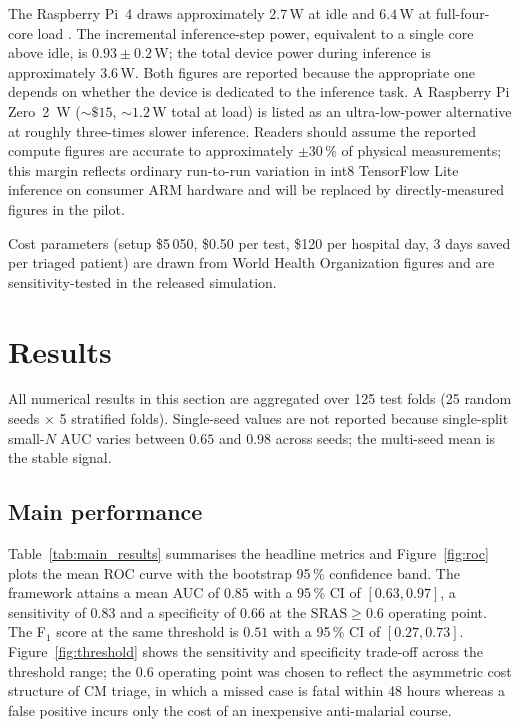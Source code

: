 \documentclass[twocolumn,10pt]{article}
\begin{document}
The Raspberry Pi~4 draws approximately $2.7$\,W at idle and
$6.4$\,W at full-four-core load \cite{RaspberryPiPower2021}. The
incremental inference-step power, equivalent to a single core
above idle, is $0.93\pm 0.2$\,W; the total device power during
inference is approximately $3.6$\,W. Both figures are reported
because the appropriate one depends on whether the device is
dedicated to the inference task. A Raspberry Pi Zero~2~W
($\sim\$15$, $\sim\!1.2$\,W total at load) is listed as an
ultra-low-power alternative at roughly three-times slower
inference. Readers should assume the reported compute figures are
accurate to approximately $\pm 30\,\%$ of physical measurements;
this margin reflects ordinary run-to-run variation in int8
TensorFlow Lite inference on consumer ARM hardware and will be
replaced by directly-measured figures in the pilot.

Cost parameters (setup \$5\,050, \$0.50 per test, \$120 per
hospital day, 3 days saved per triaged patient) are drawn from
World Health Organization figures \cite{WHO2022} and are
sensitivity-tested in the released simulation.

\section{Results}
\label{sec:results}
All numerical results in this section are aggregated over 125
test folds (25 random seeds $\times$ 5 stratified folds).
Single-seed values are not reported because single-split
small-$N$ AUC varies between $0.65$ and $0.98$ across seeds; the
multi-seed mean is the stable signal.

\subsection{Main performance}
Table~\ref{tab:main_results} summarises the headline metrics and
Figure~\ref{fig:roc} plots the mean ROC curve with the
bootstrap 95\,\% confidence band. The framework attains a mean
AUC of $0.85$ with a 95\,\% CI of $[0.63, 0.97]$, a sensitivity
of $0.83$ and a specificity of $0.66$ at the $\mathrm{SRAS}\geq 0.6$
operating point. The F$_1$ score at the same threshold is
$0.51$ with a 95\,\% CI of $[0.27, 0.73]$.
Figure~\ref{fig:threshold} shows the sensitivity and specificity
trade-off across the threshold range; the $0.6$ operating point
was chosen to reflect the asymmetric cost structure of CM
triage, in which a missed case is fatal within 48 hours whereas
a false positive incurs only the cost of an inexpensive
anti-malarial course.
\end{document}

